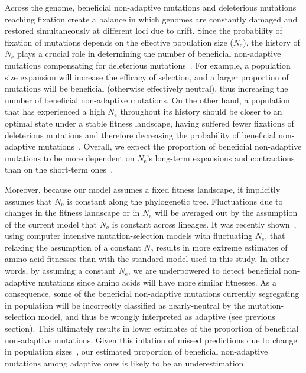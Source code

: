 \documentclass[10pt,letterpaper]{article}
\newcommand{\Ne}{N_{\text{e}}}
\begin{document}
Across the genome, beneficial non-adaptive mutations and deleterious mutations reaching fixation create a balance in which genomes are constantly damaged and restored simultaneously at different loci due to drift.
Since the probability of fixation of mutations depends on the effective population size ($\Ne$), the history of $\Ne$ plays a crucial role in determining the number of beneficial non-adaptive mutations compensating for deleterious mutations~\cite{latrille_inferring_2021}.
For example, a population size expansion will increase the efficacy of selection, and a larger proportion of mutations will be beneficial (otherwise effectively neutral), thus increasing the number of beneficial non-adaptive mutations.
On the other hand, a population that has experienced a high $\Ne$ throughout its history should be closer to an optimal state under a stable fitness landscape, having suffered fewer fixations of deleterious mutations and therefore decreasing the probability of beneficial non-adaptive mutations~\cite{huber_determining_2017}.
Overall, we expect the proportion of beneficial non-adaptive mutations to be more dependent on $\Ne$’s long-term expansions and contractions than on the short-term ones~\cite{charlesworth_other_2007,huber_determining_2017}.

Moreover, because our model assumes a fixed fitness landscape, it implicitly assumes that $\Ne$ is constant along the phylogenetic tree.
Fluctuations due to changes in the fitness landscape or in $\Ne$ will be averaged out by the assumption of the current model that $\Ne$ is constant across lineages.
It was recently shown~\cite{latrille_inferring_2021}, using computer intensive mutation-selection models with fluctuating $\Ne$, that relaxing the assumption of a constant $\Ne$ results in more extreme estimates of amino-acid fitnesses than with the standard model used in this study.
In other words, by assuming a constant $\Ne$, we are underpowered to detect beneficial non-adaptive mutations since amino acids will have more similar fitnesses.
As a consequence, some of the beneficial non-adaptive mutations currently segregating in population will be incorrectly classified as nearly-neutral by the mutation-selection model, and thus be wrongly interpreted as adaptive (see previous section).
This ultimately results in lower estimates of the proportion of beneficial non-adaptive mutations.
Given this inflation of missed predictions due to change in population sizes~\cite{lanfear_population_2014, jones_shifting_2017, platt_protein_2018}, our estimated proportion of beneficial non-adaptive mutations among adaptive ones is likely to be an underestimation.
\end{document}
